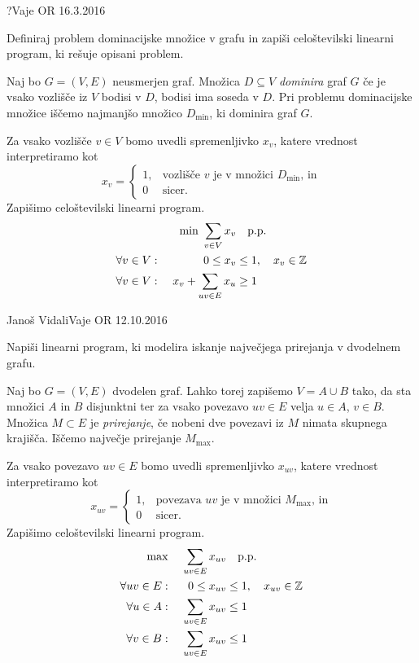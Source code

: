 \begin{naloga}{?}{Vaje OR 16.3.2016}
\begin{vprasanje}
Definiraj problem dominacijske množice v grafu
in zapiši celoštevilski linearni program,
ki rešuje opisani problem.
\end{vprasanje}

\begin{odgovor}
Naj bo $G = (V, E)$ neusmerjen graf.
Množica $D \subseteq V$ {\em dominira} graf $G$
če je vsako vozlišče iz $V$ bodisi v $D$, bodisi ima soseda v $D$.
Pri problemu dominacijske množice iščemo najmanjšo množico $D_{\min}$,
ki dominira graf $G$.

Za vsako vozlišče $v \in V$ bomo uvedli spremenljivko $x_v$,
katere vrednost interpretiramo kot
$$
x_v = \begin{cases}
1, & \text{vozlišče $v$ je v množici $D_{\min}$, in} \\
0  & \text{sicer.}
\end{cases}
$$
Zapišimo celoštevilski linearni program.
\begin{alignat*}{2}
&& \min \ \sum_{v \in V} x_v &\quad \text{p.p.} \\
\forall v \in V: &\ & 0 \le x_v &\le 1, \quad x_v \in \mathbb{Z} \\
\forall v \in V: &\ & x_v + \sum_{uv \in E} x_u &\ge 1
\end{alignat*}
\end{odgovor}
\end{naloga}


\begin{naloga}{Janoš Vidali}{Vaje OR 12.10.2016}
\begin{vprasanje}
Napiši linearni program,
ki modelira iskanje največjega prirejanja v dvodelnem grafu.
\end{vprasanje}

\begin{odgovor}
Naj bo $G = (V, E)$ dvodelen graf.
Lahko torej zapišemo $V = A \cup B$ tako,
da sta množici $A$ in $B$ disjunktni
ter za vsako povezavo $uv \in E$ velja $u \in A$, $v \in B$.
Množica $M \subset E$ je {\em prirejanje},
če nobeni dve povezavi iz $M$ nimata skupnega krajišča.
Iščemo največje prirejanje $M_{\max}$.

Za vsako povezavo $uv \in E$ bomo uvedli spremenljivko $x_{uv}$,
katere vrednost interpretiramo kot
$$
x_{uv} = \begin{cases}
1, & \text{povezava $uv$ je v množici $M_{\max}$, in} \\
0  & \text{sicer.}
\end{cases}
$$
Zapišimo celoštevilski linearni program.
\begin{alignat*}{2}
\max &\ & \sum_{uv \in E} x_{uv} &\quad \text{p.p.} \\
\forall uv \in E: &\ & 0 \le x_{uv} &\le 1, \quad x_{uv} \in \mathbb{Z} \\
\forall u \in A: &\ & \sum_{uv \in E} x_{uv} &\le 1 \\
\forall v \in B: &\ & \sum_{uv \in E} x_{uv} &\le 1
\end{alignat*}
\end{odgovor}
\end{naloga}


